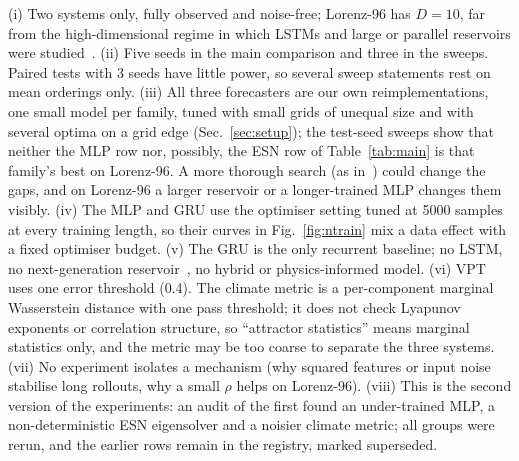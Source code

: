 (i) Two systems only, fully observed and noise-free; Lorenz-96 has $D=10$, far from the high-dimensional regime in which LSTMs and large or parallel reservoirs were studied~\cite{vlachas2018data,vlachas2020backpropagation}. (ii) Five seeds in the main comparison and three in the sweeps. Paired tests with 3 seeds have little power, so several sweep statements rest on mean orderings only. (iii) All three forecasters are our own reimplementations, one small model per family, tuned with small grids of unequal size and with several optima on a grid edge (Sec.~\ref{sec:setup}); the test-seed sweeps show that neither the MLP row nor, possibly, the ESN row of Table~\ref{tab:main} is that family's best on Lorenz-96. A more thorough search (as in~\cite{racca2021robust}) could change the gaps, and on Lorenz-96 a larger reservoir or a longer-trained MLP changes them visibly. (iv) The MLP and GRU use the optimiser setting tuned at 5000 samples at every training length, so their curves in Fig.~\ref{fig:ntrain} mix a data effect with a fixed optimiser budget. (v) The GRU is the only recurrent baseline; no LSTM, no next-generation reservoir~\cite{gauthier2021next}, no hybrid or physics-informed model. (vi) VPT uses one error threshold (0.4). The climate metric is a per-component marginal Wasserstein distance with one pass threshold; it does not check Lyapunov exponents or correlation structure, so ``attractor statistics'' means marginal statistics only, and the metric may be too coarse to separate the three systems. (vii) No experiment isolates a mechanism (why squared features or input noise stabilise long rollouts, why a small $\rho$ helps on Lorenz-96). (viii) This is the second version of the experiments: an audit of the first found an under-trained MLP, a non-deterministic ESN eigensolver and a noisier climate metric; all groups were rerun, and the earlier rows remain in the registry, marked superseded.
